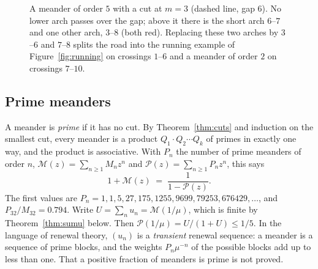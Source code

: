 \begin{figure}[t]
\centering
{}
\caption{A meander of order $5$ with a cut at $m=3$ (dashed line, gap $6$). No lower arch passes
over the gap; above it there is the short arch $6$--$7$ and one other arch, $3$--$8$ (both red).
Replacing these two arches by $3$--$6$ and $7$--$8$ splits the road into the running example of
Figure~\ref{fig:running} on crossings $1$--$6$ and a meander of order $2$ on crossings $7$--$10$.}
\label{fig:cut}
\end{figure}

\subsection{Prime meanders}

A meander is \emph{prime} if it has no cut. By Theorem~\ref{thm:cuts} and induction on the smallest
cut, every meander is a product $Q_1\cdot Q_2\cdots Q_k$ of primes in exactly one way, and the
product is associative. With $P_n$ the number of prime meanders of order $n$,
$\mathcal M(z)=\sum_{n\ge1}M_nz^n$ and $\mathcal P(z)=\sum_{n\ge1}P_nz^n$, this says
\[ 1+\mathcal M(z)\;=\;\frac1{1-\mathcal P(z)} . \]
The first values are $P_n=1,1,5,27,175,1255,9699,79253,676429,\ldots$, and $P_{32}/M_{32}=0.794$.
Write $U=\sum_n u_n=\mathcal M(1/\mu)$, which is finite by Theorem~\ref{thm:sumu} below. Then
$\mathcal P(1/\mu)=U/(1+U)\le1/5$. In the language of renewal theory, $(u_n)$ is a \emph{transient}
renewal sequence: a meander is a sequence of prime blocks, and the weights $P_n\mu^{-n}$ of the
possible blocks add up to less than one. That a positive fraction of meanders is prime is not
proved.

